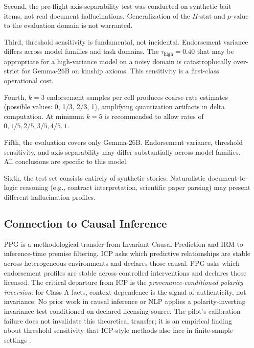 \documentclass[11pt,letterpaper]{article}
\begin{document}
Second, the pre-flight axis-separability test was conducted on synthetic bait items, not real document hallucinations. Generalization of the $H$-stat and $p$-value to the evaluation domain is not warranted.

Third, threshold sensitivity is fundamental, not incidental. Endorsement variance differs across model families and task domains. The $\tau_{\mathrm{high}}=0.40$ that may be appropriate for a high-variance model on a noisy domain is catastrophically over-strict for Gemma-26B on kinship axioms. This sensitivity is a first-class operational cost.

Fourth, $k=3$ endorsement samples per cell produces coarse rate estimates (possible values: 0, 1/3, 2/3, 1), amplifying quantization artifacts in delta computation. At minimum $k=5$ is recommended to allow rates of $0, 1/5, 2/5, 3/5, 4/5, 1$.

Fifth, the evaluation covers only Gemma-26B. Endorsement variance, threshold sensitivity, and axis separability may differ substantially across model families. All conclusions are specific to this model.

Sixth, the test set consists entirely of synthetic stories. Naturalistic document-to-logic reasoning (e.g., contract interpretation, scientific paper parsing) may present different hallucination profiles.

\subsection{Connection to Causal Inference}

PPG is a methodological transfer from Invariant Causal Prediction \citep{Peters2016} and IRM \citep{Arjovsky2019} to inference-time premise filtering. ICP asks which predictive relationships are stable across heterogeneous environments and declares those causal. PPG asks which endorsement profiles are stable across controlled interventions and declares those licensed. The critical departure from ICP is the \textit{provenance-conditioned polarity inversion}: for Class A facts, context-dependence is the signal of authenticity, not invariance. No prior work in causal inference or NLP applies a polarity-inverting invariance test conditioned on declared licensing source. The pilot's calibration failure does not invalidate this theoretical transfer; it is an empirical finding about threshold sensitivity that ICP-style methods also face in finite-sample settings \citep{Peters2016}.

\end{document}
